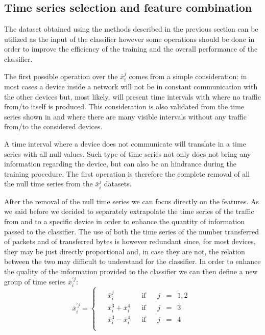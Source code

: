 \subsection{Time series selection and feature combination}

The dataset obtained using the methods described in the previous section can be utilized as the input of the classifier however some operations should be done in order to improve the efficiency of the training and the overall performance of the classifier.

The first possible operation over the $\bar{x}_i^j$ comes from a simple consideration: in most cases a device inside a network will not be in constant communication with the other devices but, most likely, will present time intervals with where no traffic from/to itself is produced. This consideration is also validated from the time series shown in  and  where there are many visible intervals without any traffic from/to the considered devices.

A time interval where a device does not communicate will translate in a time series with all null values. Such type of time series not only does not bring any information regarding the device, but can also be an hindrance during the training procedure. The first operation is therefore the complete removal of all the null time series from the $\bar{x}_i^j$ datasets.

After the removal of the null time series we can focus directly on the features. As we said before we decided to separately extrapolate the time series of the traffic from and to a specific device in order to enhance the quantity of information passed to the classifier. The use of both the time series of the number transferred of packets and of transferred bytes is however redundant since, for most devices, they may be just directly proportional and, in case they are not, the relation between the two may difficult to understand for the classifier. In order to enhance the quality of the information provided to the classifier we can then define a new group of time series $\bar{x}^{\prime j}_i$:
\begin{equation}
    \bar{x}^{\prime j}_i = 
    \begin{cases}
    \begin{aligned}
    & \bar{x}_i^j               &&\text{if}&& j&=&1,2 \\
    & \bar{x}_i^3 + \bar{x}_i^4 &&\text{if}&& j&=&3 \\
    & \bar{x}_i^3 - \bar{x}_i^4 &&\text{if}&& j&=&4 \\
    \end{aligned}
    \end{cases}
\end{equation}

